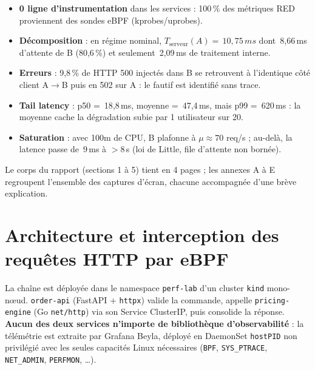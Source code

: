 \documentclass[10pt,a4paper]{article}
\newcommand{\ms}[1]{\,#1\,ms}
\newcommand{\code}[1]{\texttt{\small #1}}
\begin{document}
\begin{titlepage}
\vspace{1.4cm}
\begin{encadre}[title={Résultats clés}]
\begin{itemize}
  \item \textbf{0 ligne d'instrumentation} dans les services : 100\,\% des métriques RED proviennent des sondes eBPF (kprobes/uprobes).
  \item \textbf{Décomposition} : en régime nominal, $T_{\text{serveur}}(A)=\ms{10{,}75}$ dont \ms{8{,}66} d'attente de B (80,6\,\%) et seulement \ms{2{,}09} de traitement interne.
  \item \textbf{Erreurs} : 9,8\,\% de HTTP 500 injectés dans B se retrouvent à l'identique côté client A$\rightarrow$B puis en 502 sur A : le fautif est identifié sans trace.
  \item \textbf{Tail latency} : p50 = \ms{18{,}8}, moyenne = \ms{47{,}4}, mais p99 = \ms{620} : la moyenne cache la dégradation subie par 1 utilisateur sur 20.
  \item \textbf{Saturation} : avec 100m de CPU, B plafonne à $\mu\approx 70$ req/s ; au-delà, la latence passe de \ms{9} à $>8$\,s (loi de Little, file d'attente non bornée).
\end{itemize}
\end{encadre}

\vfill
{\small\color{grisfonce} Le corps du rapport (sections 1 à 5) tient en 4 pages ; les annexes A à E regroupent l'ensemble des captures d'écran, chacune accompagnée d'une brève explication.\par}
\end{titlepage}

\setcounter{page}{1}

\section{Architecture et interception des requêtes HTTP par eBPF}

La chaîne est déployée dans le namespace \code{perf-lab} d'un cluster \code{kind} mono-nœud. \code{order-api} (FastAPI + \code{httpx}) valide la commande, appelle \code{pricing-engine} (Go \code{net/http}) via son Service ClusterIP, puis consolide la réponse. \textbf{Aucun des deux services n'importe de bibliothèque d'observabilité} : la télémétrie est extraite par Grafana Beyla, déployé en DaemonSet \code{hostPID} non privilégié avec les seules capacités Linux nécessaires (\code{BPF}, \code{SYS\_PTRACE}, \code{NET\_ADMIN}, \code{PERFMON}, …).
\end{document}
